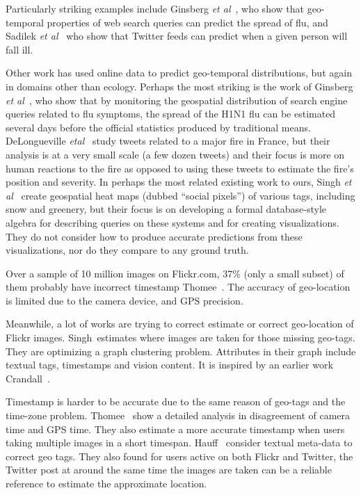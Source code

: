 Particularly striking examples include Ginsberg
\textit{et al}~\cite{ginsberg09flu}, who show that 
geo-temporal properties of web search queries can
predict the spread of flu, and Sadilek \textit{et al}~\cite{Sadilek:2012wp} who show that
Twitter feeds can predict when a given person will
fall ill.


Other work has used online data to predict geo-temporal distributions,
but again in domains other than ecology.  Perhaps the most
striking is the work of Ginsberg \textit{et al}~\cite{ginsberg09flu},
who show that by monitoring the geospatial distribution of search
engine queries related to flu symptoms, the spread of the H1N1
flu can be estimated several days before the official statistics produced by traditional
means.
DeLongueville \textit{etal}~\cite{delongueville09} study tweets related to a major fire in
France, but their analysis is at a very small scale (a few dozen
tweets) and their focus is more on human reactions to the fire as
opposed to using these tweets to estimate the fire's position and
severity.  In perhaps the most related existing work to ours,
 Singh \textit{et al}~\cite{singh10socialpixels} create
geospatial heat maps (dubbed ``social pixels'') of various
tags, including snow and greenery, but their focus is on developing a
formal database-style algebra for describing queries on these systems
and for creating visualizations. They do not consider how to produce
accurate predictions from these visualizations, nor do they compare to
any ground truth.

Over a sample of 10 million images on Flickr.com, 37\% (only a small subset) of them probably have incorrect timestamp Thomee\etal~\cite{thomee2014s}.
The accuracy of geo-location is limited due to the camera device, and GPS precision.

Meanwhile, a lot of works are trying to correct estimate or correct geo-location of Flickr images.
Singh\etal~\cite{singh2010geo}estimates where images are taken for those missing geo-tags. They are optimizing a graph clustering problem. Attributes in their graph include textual tags, timestamps and vision content. It is inspired by an earlier work Crandall\etal~\cite{crandall2009mapping}.


Timestamp is harder to be accurate due to the same reason of geo-tags and the time-zone problem. 
Thomee\etal~\cite{thomee2014s}  show  a detailed analysis in disagreement of camera time and GPS time. They also estimate a more accurate timestamp when users taking multiple images in a short timespan.
Hauff\etal~\cite{hauff2012geo} consider textual meta-data to correct geo tags. 
They also found for users active on both Flickr and Twitter, the Twitter post at around the same time the images are taken can be a reliable reference to estimate the approximate location.



